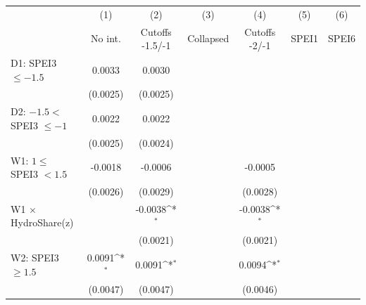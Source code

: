{
\def\sym#1{\ifmmode^{#1}\else\(^{#1}\)\fi}
\begin{tabular}{l*{6}{c}}
\toprule
                    &\multicolumn{1}{c}{(1)}&\multicolumn{1}{c}{(2)}&\multicolumn{1}{c}{(3)}&\multicolumn{1}{c}{(4)}&\multicolumn{1}{c}{(5)}&\multicolumn{1}{c}{(6)}\\
                    &\multicolumn{1}{c}{No int.}&\multicolumn{1}{c}{Cutoffs -1.5/-1}&\multicolumn{1}{c}{Collapsed}&\multicolumn{1}{c}{Cutoffs -2/-1}&\multicolumn{1}{c}{SPEI1}&\multicolumn{1}{c}{SPEI6}\\
\midrule
D1: SPEI3 $\leq -1.5$&      0.0033         &      0.0030         &                     &                     &                     &                     \\
                    &    (0.0025)         &    (0.0025)         &                     &                     &                     &                     \\
\addlinespace
D2: $-1.5 <$ SPEI3 $\leq -1$&      0.0022         &      0.0022         &                     &                     &                     &                     \\
                    &    (0.0025)         &    (0.0024)         &                     &                     &                     &                     \\
\addlinespace
W1: $1 \leq$ SPEI3 $< 1.5$&     -0.0018         &     -0.0006         &                     &     -0.0005         &                     &                     \\
                    &    (0.0026)         &    (0.0029)         &                     &    (0.0028)         &                     &                     \\
\addlinespace
W1 $\times$ HydroShare(z)&                     &     -0.0038\sym{*}  &                     &     -0.0038\sym{*}  &                     &                     \\
                    &                     &    (0.0021)         &                     &    (0.0021)         &                     &                     \\
\addlinespace
W2: SPEI3 $\geq 1.5$&      0.0091\sym{*}  &      0.0091\sym{*}  &                     &      0.0094\sym{*}  &                     &                     \\
                    &    (0.0047)         &    (0.0047)         &                     &    (0.0046)         &                     &                     \\

\end{tabular}}
